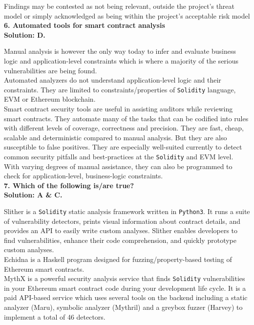 Findings may be contested as not being relevant, outside the project's threat model or simply acknowledged as being within the project's acceptable risk model\\

\textbf{6. Automated tools for smart contract analysis}\label{sec:exam6_q6}\\

\textbf{Solution: D.}

Manual analysis is however the only way today to infer and evaluate business logic and application-level constraints which is where a majority of the serious vulnerabilities are being found.\\

Automated analyzers do not understand application-level logic and their constraints.
They are limited to constraints/properties of \verb|Solidity| language, EVM or Ethereum blockchain.\\

Smart contract security tools are useful in assisting auditors while reviewing smart contracts.
They automate many of the tasks that can be codified into rules with different levels of coverage, correctness and precision.
They are fast, cheap, scalable and deterministic compared to manual analysis.
But they are also susceptible to false positives.
They are especially well-suited currently to detect common security pitfalls and best-practices at the \verb|Solidity| and EVM level.
With varying degrees of manual assistance, they can also be programmed to check for application-level, business-logic constraints.\\

\textbf{7. Which of the following is/are true?}\label{sec:exam6_q7}\\

\textbf{Solution: A \& C.}

Slither is a \verb|Solidity| static analysis framework written in \verb|Python3|.
It runs a suite of vulnerability detectors, prints visual information about contract details, and provides an API to easily write custom analyses.
Slither enables developers to find vulnerabilities, enhance their code comprehension, and quickly prototype custom analyses.\\

Echidna is a Haskell program designed for fuzzing/property-based testing of Ethereum smart contracts.\\

MythX is a powerful security analysis service that finds \verb|Solidity| vulnerabilities in your Ethereum smart contract code during your development life cycle.
It is a paid API-based service which uses several tools on the backend including a static analyzer (Maru), symbolic analyzer (Mythril) and a greybox fuzzer (Harvey) to implement a total of 46 detectors.\\


